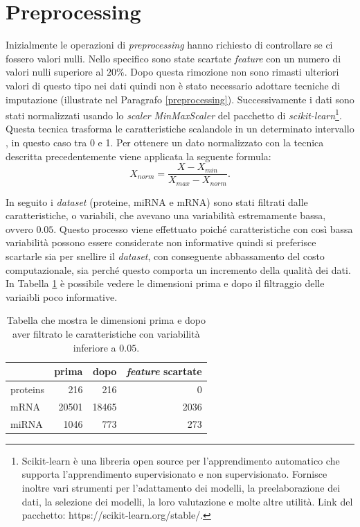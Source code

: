 \documentclass[12pt,italian]{report}
\begin{document}
	\section{Preprocessing}
	Inizialmente le operazioni di \textit{preprocessing} hanno richiesto di controllare se ci fossero valori nulli. Nello specifico sono state scartate \textit{feature} con un numero di valori nulli superiore al $20\%$. Dopo questa rimozione non sono rimasti ulteriori valori di questo tipo nei dati quindi non è stato necessario adottare tecniche di imputazione (illustrate nel Paragrafo \ref{preprocessing}). 
	Successivamente i dati sono stati normalizzati usando lo \textit{scaler} \textit{MinMaxScaler} del pacchetto di \textit{scikit-learn}\footnote{Scikit-learn è una libreria open source per l'apprendimento automatico che supporta l'apprendimento supervisionato e non supervisionato. Fornisce inoltre vari strumenti per l'adattamento dei modelli, la preelaborazione dei dati, la selezione dei modelli, la loro valutazione e molte altre utilità. Link del pacchetto: https://scikit-learn.org/stable/.}. Questa tecnica trasforma le caratteristiche scalandole in un determinato intervallo \cite{minmaxscaler}, in questo caso tra 0 e 1. Per ottenere un dato normalizzato con la tecnica descritta precedentemente viene applicata la seguente formula:
	\begin{equation}
		X_{norm} = \frac{X - X_{min}}{X_{max}-X_{norm}}.
	\end{equation}	
	
	In seguito i \textit{dataset} (proteine, miRNA e mRNA) sono stati filtrati dalle caratteristiche, o variabili, che avevano una variabilità estremamente bassa, ovvero $0.05$. Questo processo viene effettuato poiché caratteristiche con così bassa variabilità possono essere considerate non informative quindi si preferisce scartarle sia per snellire il \textit{dataset}, con conseguente abbassamento del costo computazionale, sia perché questo comporta un incremento della qualità dei dati. 
	In Tabella \ref{dimensioniAfterLowVariabiloity} è possibile vedere le dimensioni prima e dopo il filtraggio delle variaibli poco informative.
	
	\begin{table}[h]
		\begin{center}
			\begin{adjustbox}{max width=\textwidth}
				\begin{tabular}{lrrr}
					\toprule
					{} &    prima &  dopo & \textit{feature} scartate\\
					\midrule
					proteins & 216 &216 &0 \\
					mRNA & 20501 & 18465 & 2036\\
					miRNA  & 1046 & 773 & 273\\
					\bottomrule
				\end{tabular}
			\end{adjustbox}
		\end{center}
		\caption{Tabella che mostra le dimensioni prima e dopo aver filtrato le caratteristiche con variabilità inferiore a $0.05$.}
		\label{dimensioniAfterLowVariabiloity}
	\end{table}
\end{document}

